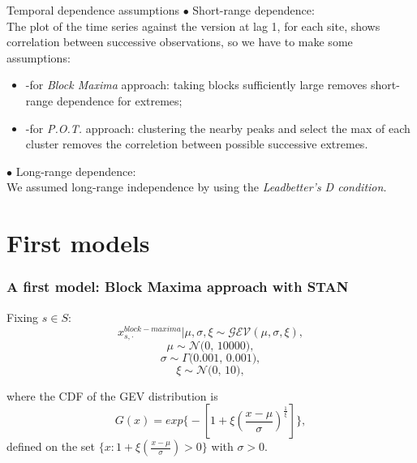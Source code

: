 \documentclass[usenames,dvipsnames]{beamer}
\begin{document}
\begin{frame}{Temporal dependence assumptions}
\small
 $\bullet$ Short-range dependence:\\
 The plot of the time series against the version at lag 1, for each site, shows correlation between successive observations, so we have to make some assumptions: 
    \begin{itemize}
    
        \item -for \textit{Block Maxima} approach:    %
        taking blocks sufficiently large removes short-range dependence for extremes;
        \\
        \vspace{4pt}
        
        \item -for \textit{P.O.T.} approach: clustering the nearby peaks and 
        select the max of each cluster removes the correletion between possible successive extremes.
        \\
    \end{itemize}
$\bullet$ Long-range dependence:\\
We assumed long-range independence by using the \textit{Leadbetter's D condition}. %
\\
\end{frame}

\section{First models}

\begin{frame}
\frametitle{A first model: \textbf{Block Maxima approach} with STAN}
\footnotesize
Fixing $s \in S$:
\begin{equation*}
    x_{s,\cdot}^{block-maxima}|\mu,\sigma,\xi \sim \mathcal{GEV}(\mu,\sigma,\xi),
\end{equation*}   
\begin{equation*}
    \mu \sim \mathcal{N}\textit{(0, 10000)},
\end{equation*}
\begin{equation*}
    \sigma \sim \Gamma\textit{(0.001, 0.001)},
\end{equation*}
\begin{equation*}
    \xi \sim \mathcal{N}\textit{(0, 10)},
\end{equation*}

\vspace{12pt} 
where the CDF of the GEV distribution is 
\begin{equation*}
G(x)=exp \bigg\{-[ 1+\xi( \frac{x-\mu}{\sigma})^{\frac{1}{\xi} }]\bigg\},
\end{equation*}   
defined on the set $\{ x: 1 + \xi( \frac{x-\mu}{\sigma})>0\}$ with $\sigma > 0$. 
\end{frame}
\end{document}
